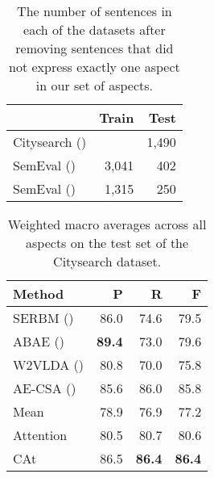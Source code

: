 \documentclass[11pt,a4paper]{article}
\newlength{\catheight}
\newcommand{\ourmodel}{CAt~\raisebox{-0.1ex}{\texttt{[image: fig/cat]}}} \definecolor{aspectcolor}{HTML}{fb7e5e}
\begin{document}
\begin{table}[t]\centering
\begin{tabular}{lrr}  & \textbf{Train} & \textbf{Test}  \\ \midrule
Citysearch (\citeyear{ganu2009beyond})  &       & 1,490 \\
SemEval (\citeyear{pontiki2014semeval}) & 3,041 &   402 \\
SemEval (\citeyear{pontiki2015semeval}) & 1,315 &   250 \\
\end{tabular}
\caption{The number of sentences in each of the datasets after removing sentences that did not express exactly one aspect in our set of aspects.}\label{tab:corpora}
\end{table}

\begin{table}[t]\centering
\begin{tabular}{lrrr}
\textbf{Method} & \textbf{P} & \textbf{R} & \textbf{F} \\ \midrule
SERBM (\citeyear{wang2015sentiment})    & 86.0  & 74.6  & 79.5  \\
ABAE (\citeyear{he2017unsupervised})    & \textbf{89.4}  & 73.0  & 79.6  \\
W2VLDA (\citeyear{garcia2018w2vlda})    & 80.8  & 70.0  & 75.8  \\
AE-CSA (\citeyear{luo2019unsupervised}) & 85.6  & 86.0  & 85.8 \\
Mean      & 78.9  & 76.9  & 77.2  \\
Attention & 80.5  & 80.7  & 80.6  \\
\ourmodel & 86.5  & \textbf{86.4}  & \textbf{86.4}
\end{tabular}
\caption{Weighted macro averages across all aspects on the test set of the Citysearch dataset.}\label{tblresultsmacro}
\end{table}
\end{document}
